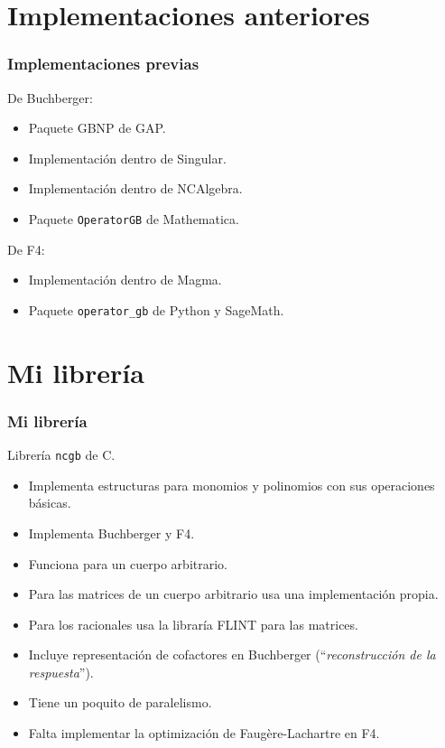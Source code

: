 \documentclass[spanish, aspectratio=169, hidecontrols]{beamer}
\newcommand\cpp{C\nolinebreak[4]\hspace{-.05em}\raisebox{.4ex}{\relsize{-3}{\textbf{++}}}\xspace}
\begin{document}
\section{Implementaciones anteriores}

\begin{frame}
  \frametitle{Implementaciones previas}
  \pause
  De Buchberger:
  \begin{itemize}
    \item Paquete GBNP de GAP.
    \item Implementación dentro de Singular.
    \item Implementación dentro de NCAlgebra.
    \item Paquete \texttt{OperatorGB} de Mathematica.
  \end{itemize}
  \pause
  De F4:
  \begin{itemize}
    \item Implementación dentro de Magma.
    \item Paquete \texttt{operator\_gb} de Python y SageMath.
  \end{itemize}
\end{frame}

\section{Mi librería}

\begin{frame}
  \frametitle{Mi librería}
  Librería \texttt{ncgb} de \cpp.
  \pause
  \begin{itemize}
    \item Implementa estructuras para monomios y polinomios con sus operaciones básicas.
    \pause
    \item Implementa Buchberger y F4.
    \pause
    \item Funciona para un \alert{cuerpo arbitrario}.
    \pause
    \item Para las matrices de un cuerpo arbitrario usa una implementación propia.
    \pause
    \item Para los racionales usa la libraría FLINT para las matrices.
    \pause
    \item Incluye \alert{representación de cofactores} en Buchberger (``\textit{reconstrucción de la respuesta}'').
    \pause
    \item Tiene un poquito de paralelismo.
    \pause
    \item Falta implementar la optimización de Faugère-Lachartre en F4.
  \end{itemize}
\end{frame}
\end{document}
